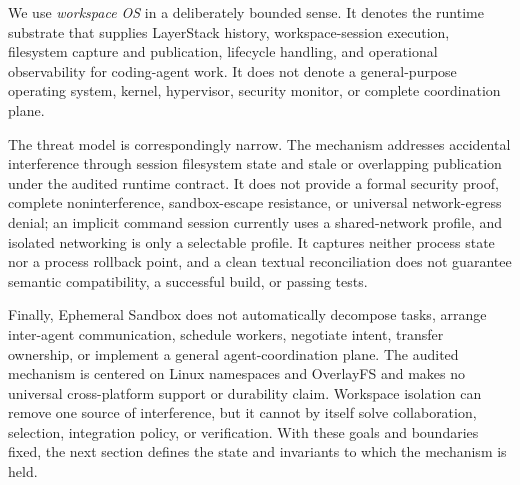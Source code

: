 We use \emph{workspace OS} in a deliberately bounded sense.  It denotes the
runtime substrate that supplies LayerStack history, workspace-session
execution, filesystem capture and publication, lifecycle handling, and
operational observability for coding-agent work.  It does not denote a
general-purpose operating system, kernel, hypervisor, security monitor, or
complete coordination plane.

The threat model is correspondingly narrow.  The mechanism addresses
accidental interference through session filesystem state and stale or
overlapping publication under the audited runtime contract.  It does not
provide a formal security proof, complete noninterference, sandbox-escape
resistance, or universal network-egress denial; an implicit command session
currently uses a shared-network profile, and isolated networking is only a
selectable profile.  It captures neither process state nor a process rollback
point, and a clean textual reconciliation does not guarantee semantic
compatibility, a successful build, or passing tests.

Finally, Ephemeral Sandbox does not automatically decompose tasks, arrange
inter-agent communication, schedule workers, negotiate intent, transfer
ownership, or implement a general agent-coordination plane.  The audited
mechanism is centered on Linux namespaces and OverlayFS and makes no universal
cross-platform support or durability claim.  Workspace isolation can remove
one source of interference, but it cannot by itself solve collaboration,
selection, integration policy, or verification.  With these goals and
boundaries fixed, the next section defines the state and invariants to which
the mechanism is held.
